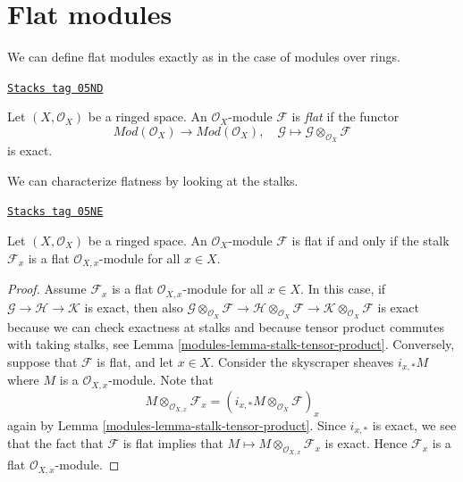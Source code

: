 \section{Flat modules}
\label{modules-section-flat}
We can define flat modules exactly as in the case of modules over rings.

\begin{definition}[Flat]
\label{modules-definition-flat}
\href{https://stacks.math.columbia.edu/tag/05ND}{\texttt{Stacks tag 05ND}}

Let $(X, \mathcal{O}_X)$ be a ringed space.
An $\mathcal{O}_X$-module $\mathcal{F}$ is {\it flat} if the functor
$$
\textit{Mod}(\mathcal{O}_X)
\longrightarrow
\textit{Mod}(\mathcal{O}_X), \quad
\mathcal{G} \mapsto \mathcal{G} \otimes_{\mathcal{O}_X} \mathcal{F}
$$
is exact.
\end{definition}

We can characterize flatness by looking at the stalks.

\begin{lemma}
\label{modules-lemma-flat-stalks-flat}
\href{https://stacks.math.columbia.edu/tag/05NE}{\texttt{Stacks tag 05NE}}

Let $(X, \mathcal{O}_X)$ be a ringed space.
An $\mathcal{O}_X$-module $\mathcal{F}$ is flat
if and only if the stalk $\mathcal{F}_x$ is a flat
$\mathcal{O}_{X, x}$-module for all $x \in X$.
\end{lemma}

\begin{proof}

Assume $\mathcal{F}_x$ is a flat $\mathcal{O}_{X, x}$-module for all
$x \in X$. In this case, if $\mathcal{G} \to \mathcal{H} \to \mathcal{K}$
is exact, then also
$\mathcal{G} \otimes_{\mathcal{O}_X} \mathcal{F} \to
\mathcal{H} \otimes_{\mathcal{O}_X} \mathcal{F} \to
\mathcal{K} \otimes_{\mathcal{O}_X} \mathcal{F}$
is exact because we can check exactness at stalks and because
tensor product commutes with taking stalks, see
Lemma \ref{modules-lemma-stalk-tensor-product}.
Conversely, suppose that $\mathcal{F}$ is flat, and let $x \in X$.
Consider the skyscraper sheaves $i_{x, *} M$ where $M$ is a
$\mathcal{O}_{X, x}$-module. Note that
$$
M \otimes_{\mathcal{O}_{X, x}} \mathcal{F}_x =
\left(i_{x, *} M \otimes_{\mathcal{O}_X} \mathcal{F}\right)_x
$$
again by
Lemma \ref{modules-lemma-stalk-tensor-product}.
Since $i_{x, *}$ is exact, we see that the fact that $\mathcal{F}$
is flat implies that $M \mapsto M \otimes_{\mathcal{O}_{X, x}} \mathcal{F}_x$
is exact. Hence $\mathcal{F}_x$ is a flat $\mathcal{O}_{X, x}$-module.
\end{proof}

